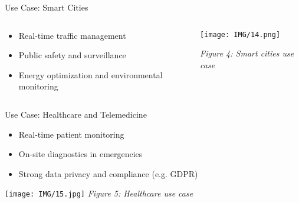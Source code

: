 \documentclass{beamer}
\begin{document}
\begin{frame}{Use Case: Smart Cities}
    \begin{columns}[t]  %
      \begin{column}{0.5\textwidth}
        \begin{itemize}
          \item Real-time traffic management
          \item Public safety and surveillance
          \item Energy optimization and environmental monitoring
        \end{itemize}
      \end{column}
  
      \begin{column}{0.5\textwidth}
        \texttt{[image: IMG/14.png]}
        \vspace{0.2cm}
  
        \small \textit{Figure 4: Smart cities use case}
      \end{column}
    \end{columns}
  
  \end{frame}
  

\begin{frame}{Use Case: Healthcare and Telemedicine}
  \begin{itemize}
    \item Real-time patient monitoring
    \item On-site diagnostics in emergencies
    \item Strong data privacy and compliance (e.g. GDPR)
  \end{itemize}
  \vspace{0.5cm}
  \centering
  \texttt{[image: IMG/15.jpg]} %
  \vspace{0.2cm}
  \small \textit{Figure 5: Healthcare use case}
\end{frame}
\end{document}
